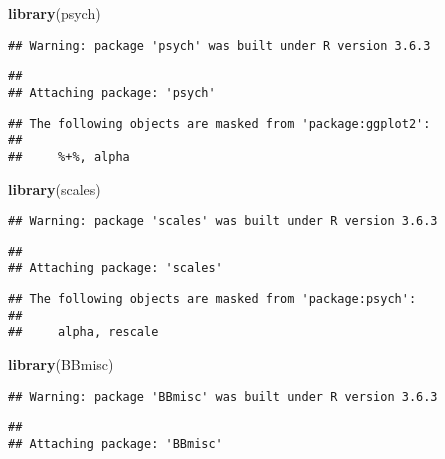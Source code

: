 \documentclass[
]{article}
\newenvironment{Shaded}{\begin{snugshade}}{\end{snugshade}}
\newcommand{\KeywordTok}[1]{\textcolor[rgb]{0.13,0.29,0.53}{\textbf{#1}}}
\newcommand{\NormalTok}[1]{#1}
\begin{document}
\begin{Shaded}
\begin{Highlighting}[]
\KeywordTok{library}\NormalTok{(psych)}
\end{Highlighting}
\end{Shaded}

\begin{verbatim}
## Warning: package 'psych' was built under R version 3.6.3
\end{verbatim}

\begin{verbatim}
## 
## Attaching package: 'psych'
\end{verbatim}

\begin{verbatim}
## The following objects are masked from 'package:ggplot2':
## 
##     %+%, alpha
\end{verbatim}

\begin{Shaded}
\begin{Highlighting}[]
\KeywordTok{library}\NormalTok{(scales)}
\end{Highlighting}
\end{Shaded}

\begin{verbatim}
## Warning: package 'scales' was built under R version 3.6.3
\end{verbatim}

\begin{verbatim}
## 
## Attaching package: 'scales'
\end{verbatim}

\begin{verbatim}
## The following objects are masked from 'package:psych':
## 
##     alpha, rescale
\end{verbatim}

\begin{Shaded}
\begin{Highlighting}[]
\KeywordTok{library}\NormalTok{(BBmisc)}
\end{Highlighting}
\end{Shaded}

\begin{verbatim}
## Warning: package 'BBmisc' was built under R version 3.6.3
\end{verbatim}

\begin{verbatim}
## 
## Attaching package: 'BBmisc'
\end{verbatim}
\end{document}
